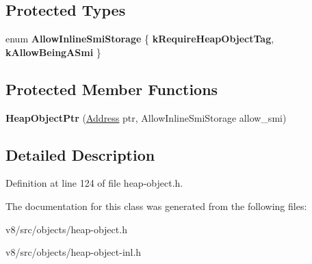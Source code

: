 \subsection*{Protected Types}
\begin{DoxyCompactItemize}
\item 
\mbox{\label{classv8_1_1internal_1_1HeapObjectPtr_adabe074ddf1486294e01270c0b626bd6}} 
enum {\bfseries Allow\+Inline\+Smi\+Storage} \{ {\bfseries k\+Require\+Heap\+Object\+Tag}, 
{\bfseries k\+Allow\+Being\+A\+Smi}
 \}
\end{DoxyCompactItemize}
\subsection*{Protected Member Functions}
\begin{DoxyCompactItemize}
\item 
\mbox{\label{classv8_1_1internal_1_1HeapObjectPtr_a02a9b144523f81594e525200252861a3}} 
{\bfseries Heap\+Object\+Ptr} (\mbox{\hyperlink{classuintptr__t}{Address}} ptr, Allow\+Inline\+Smi\+Storage allow\+\_\+smi)
\end{DoxyCompactItemize}


\subsection{Detailed Description}


Definition at line 124 of file heap-\/object.\+h.



The documentation for this class was generated from the following files\+:\begin{DoxyCompactItemize}
\item 
v8/src/objects/heap-\/object.\+h\item 
v8/src/objects/heap-\/object-\/inl.\+h\end{DoxyCompactItemize}
